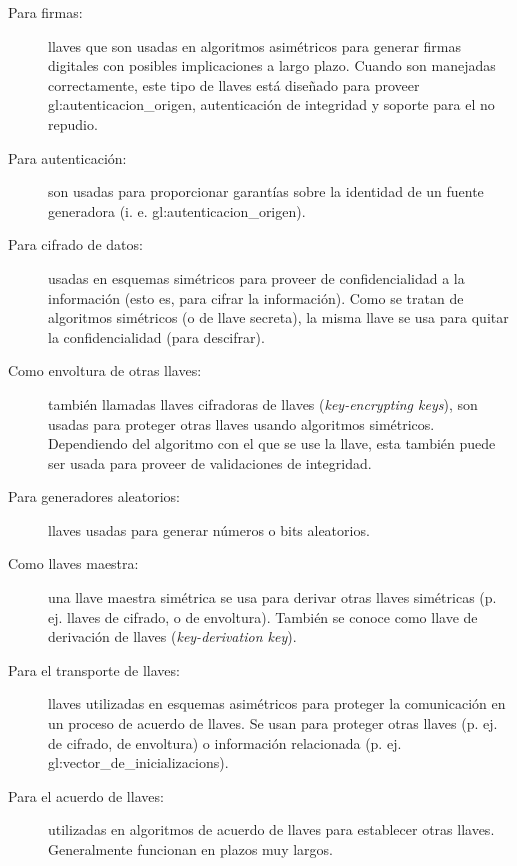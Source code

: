 \begin{description}

  \item[Para firmas:] llaves que son usadas en algoritmos asimétricos para
    generar firmas digitales con posibles implicaciones a largo plazo. Cuando
    son manejadas correctamente, este tipo de llaves está diseñado para
    proveer \gls{gl:autenticacion_origen}, autenticación de integridad y
    soporte para el no repudio.

  \item[Para autenticación:] son usadas para proporcionar garantías sobre la
    identidad de un fuente generadora (i. e. \gls{gl:autenticacion_origen}).

  \item[Para cifrado de datos:] usadas en esquemas simétricos para proveer de
    confidencialidad a la información (esto es, para cifrar la información).
    Como se tratan de algoritmos simétricos (o de llave secreta), la misma
    llave se usa para quitar la confidencialidad (para descifrar).

  \item[Como envoltura de otras llaves:] también llamadas llaves cifradoras de
    llaves (\textit{key-encrypting keys}), son usadas para proteger otras
    llaves usando algoritmos simétricos. Dependiendo del algoritmo con el que
    se use la llave, esta también puede ser usada para proveer de validaciones
    de integridad.

  \item[Para generadores aleatorios:] llaves usadas para generar números o bits
    aleatorios.

  \item[Como llaves maestra:] una llave maestra simétrica se usa para derivar
    otras llaves simétricas (p. ej. llaves de cifrado, o de envoltura). También
    se conoce como llave de derivación de llaves (\textit{key-derivation key}).

  \item[Para el transporte de llaves:] llaves utilizadas en esquemas
    asimétricos para proteger la comunicación en un proceso de acuerdo de
    llaves. Se usan para proteger otras llaves (p. ej. de cifrado, de
    envoltura) o información relacionada (p. ej.
    \glspl{gl:vector_de_inicializacion}).

  \item[Para el acuerdo de llaves:] utilizadas en algoritmos de acuerdo de
    llaves para establecer otras llaves. Generalmente funcionan en plazos muy
    largos.


\end{description}
